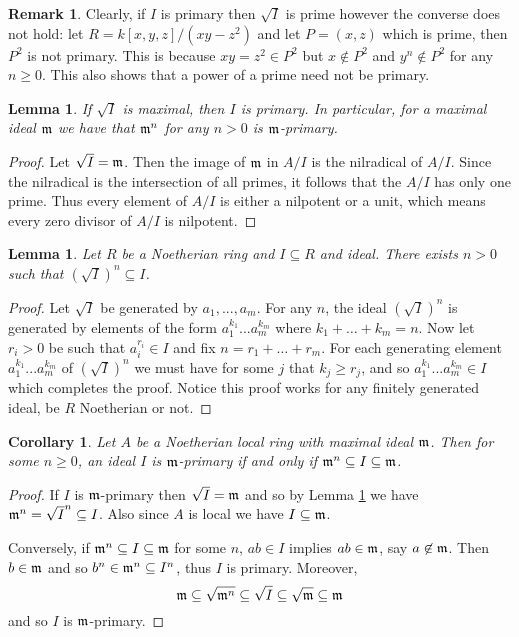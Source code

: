 \documentclass[12pt]{article}
\theoremstyle{plain}
\newtheorem{lemma}[thm]{Lemma}
\newtheorem{cor}[thm]{Corollary}
\theoremstyle{definition}
\newtheorem{remark}[thm]{Remark}
\begin{document}
	\begin{remark}
		\label{rem:radical_prime}
		Clearly, if $I$ is primary then $\sqrt{I}$ is prime however the converse does not hold: let $R = k[x,y,z]/(xy - z^2)$ and let $P = (x,z)$ which is prime, then $P^2$ is not primary. This is because $xy = z^2 \in P^2$ but $x \not\in P^2$ and $y^n \not\in P^2$ for any $n \geq 0$. This also shows that a power of a prime need not be primary.
	\end{remark}
	\begin{lemma}
		If $\sqrt{I}$ is maximal, then $I$ is primary. In particular, for a maximal ideal $\frak{m}$ we have that $\frak{m}^n$ for any $n > 0$ is $\frak{m}$-primary.
	\end{lemma}
	\begin{proof}
		Let $\sqrt{I} = \frak{m}$. Then the image of $\frak{m}$ in $A/I$ is the nilradical of $A/I$. Since the nilradical is the intersection of all primes, it follows that the $A/I$ has only one prime. Thus every element of $A/I$ is either a nilpotent or a unit, which means every zero divisor of $A/I$ is nilpotent.
	\end{proof}
	\begin{lemma}
		\label{lem:radical_power} Let $R$ be a Noetherian ring and $I \subseteq R$ and ideal. There exists $n > 0$ such that $(\sqrt{I})^n \subseteq I$.
	\end{lemma}
	\begin{proof}
		Let $\sqrt{I}$ be generated by $a_1,...,a_m$. For any $n$, the ideal $(\sqrt{I})^n$ is generated by elements of the form $a_1^{k_1}...a_m^{k_m}$ where $k_1 + \hdots + k_m = n$. Now let $r_i>0$ be such that $a_i^{r_i} \in I$ and fix $n = r_1 + \hdots + r_m$. For each generating element $a_1^{k_1}...a_m^{k_m}$ of $(\sqrt{I})^n$ we must have for some $j$ that $k_j \geq r_j$, and so $a_1^{k_1}...a_m^{k_m} \in I$ which completes the proof. Notice this proof works for any finitely generated ideal, be $R$ Noetherian or not.
	\end{proof}
	\begin{cor}
		\label{cor:primary_ideals_nested}
		Let $A$ be a Noetherian local ring with maximal ideal $\frak{m}$. Then for some $n \geq 0$, an ideal $I$ is $\frak{m}$-primary if and only if $\frak{m}^n \subseteq I \subseteq \frak{m}$.
	\end{cor}
	\begin{proof}
		If $I$ is $\frak{m}$-primary then $\sqrt{I} = \frak{m}$ and so by Lemma \ref{lem:radical_power} we have $\frak{m}^n = \sqrt{I}^n \subseteq I$. Also since $A$ is local we have $I \subseteq \frak{m}$.
		
		Conversely, if $\frak{m}^n \subseteq I \subseteq \frak{m}$ for some $n$, $ab \in I$ implies $ab \in \frak{m}$, say $a \not\in \frak{m}$. Then $b \in \frak{m}$ and so $b^n \in \frak{m}^n \subseteq I^n$, thus $I$ is primary. Moreover,
		\[\frak{m} \subseteq \sqrt{\frak{m}^n} \subseteq \sqrt{I} \subseteq \sqrt{\frak{m}} \subseteq \frak{m}\]
		and so $I$ is $\frak{m}$-primary.
	\end{proof}
\end{document}
